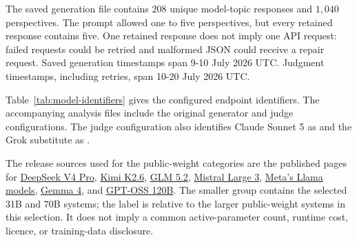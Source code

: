 \documentclass[11pt,a4paper]{article}
\begin{document}
The saved generation file contains $208$ unique model-topic responses and $1{,}040$ perspectives. The prompt allowed one to five perspectives, but every retained response contains five. One retained response does not imply one API request: failed requests could be retried and malformed JSON could receive a repair request. Saved generation timestamps span 9-10 July 2026 UTC. Judgment timestamps, including retries, span 10-20 July 2026 UTC.

Table~\ref{tab:model-identifiers} gives the configured endpoint identifiers. The accompanying analysis files include the original generator and judge configurations. The judge configuration also identifies Claude Sonnet 5 as  and the Grok substitute as .

The release sources used for the public-weight categories are the published pages for \href{https://huggingface.co/deepseek-ai/DeepSeek-V4-Pro}{DeepSeek V4 Pro}, \href{https://huggingface.co/moonshotai/Kimi-K2.6}{Kimi K2.6}, \href{https://huggingface.co/zai-org/GLM-5.2}{GLM 5.2}, \href{https://huggingface.co/collections/mistralai/mistral-large-3}{Mistral Large 3}, \href{https://ai.meta.com/llama/get-started/}{Meta's Llama models}, \href{https://blog.google/innovation-and-ai/technology/developers-tools/gemma-4/}{Gemma 4}, and \href{https://huggingface.co/openai/gpt-oss-120b}{GPT-OSS 120B}. The smaller group contains the selected 31B and 70B systems; the label is relative to the larger public-weight systems in this selection. It does not imply a common active-parameter count, runtime cost, licence, or training-data disclosure.
\end{document}
